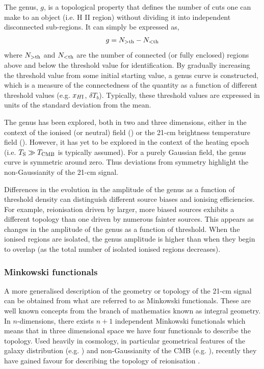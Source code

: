 The genus, $g$, is a topological property that defines the number of cuts one can make to an object (i.e. H {\scriptsize II} region) without dividing it into independent disconnected sub-regions. It can simply be expressed as,
\begin{eqnarray}
g = N_{\rm >th} - N_{\rm < th}
\end{eqnarray}
where $N_{\rm >th}$ and $N_{\rm < th}$ are the number of connected (or fully enclosed) regions above and below the threshold value for identification. By gradually increasing the threshold value from some initial starting value, a genus curve is constructed, which is a measure of the connectedness of the quantity as a function of different threshold values (e.g. $x_{H {\rm \scriptsize I}}$, $\delta T_{b}$). Typically, these threshold values are expressed in units of the standard deviation from the mean.

The genus has been explored, both in two and three dimensions, either in the context of the ionised (or neutral) field (\cite{Gleser:2006,Lee:2008,Friedrich:2011}) or the 21-cm brightness temperature field (\cite{Hong:2014,Wang:2015}). However, it has yet to be explored in the context of the heating epoch (i.e. $T_{\rm S} \gg T_{\rm CMB}$ is typically assumed). For a purely Gaussian field, the genus curve is symmetric around zero. Thus deviations from symmetry highlight the non-Gaussianity of the 21-cm signal. 

Differences in the evolution in the amplitude of the genus as a function of threshold density can distinguish different source biases and ionising efficiencies. For example, reionisation driven by larger, more biased sources exhibits a different topology than one driven by numerous fainter sources. This appears as changes in the amplitude of the genus as a function of threshold. When the ionised regions are isolated, the genus amplitude is higher than when they begin to overlap (as the total number of isolated ionised regions decreases).

\subsubsection{Minkowski functionals}

A more generalised description of the geometry or topology of the 21-cm signal can be obtained from what are referred to as Minkowski functionals. These are well known concepts from the branch of mathematics known as integral geometry. In $n$-dimensions, there exists $n+1$ independent Minkowski functionals which means that in three dimensional space we have four functionals to describe the topology. Used heavily in cosmology, in particular geometrical features of the galaxy distribution (e.g. \cite{Gott:1986,Schmalzing:1997}) and non-Gaussianity of the CMB (e.g. \cite{Komatsu:2009}), recently they have gained favour for describing the topology of reionisation \cite{Gleser:2006,Friedrich:2011,Yoshiura:2017,Chen:2018}.

